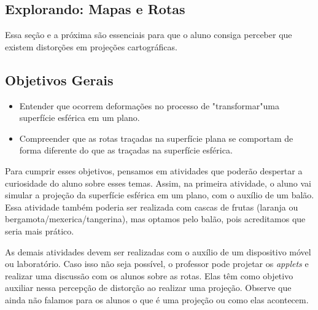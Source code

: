 \def\currentcolor{session1}
\begin{texto}{
\section{Explorando: Mapas e Rotas}

Essa seção e a próxima são essenciais para que o aluno consiga perceber que existem distorções em projeções cartográficas.

\subsection{Objetivos Gerais}

\begin{itemize}
\item Entender que ocorrem deformações no processo de  "transformar"{}uma superfície esférica em um plano.

\item Compreender que as rotas traçadas na superfície plana se comportam de forma diferente do que as traçadas na superfície esférica.
\end{itemize}

Para cumprir esses objetivos, pensamos em atividades que poderão despertar a curiosidade do aluno sobre esses temas. Assim, na primeira atividade, o aluno vai simular a projeção da superfície esférica em um plano, com o auxílio de um balão. Essa atividade também poderia ser realizada com cascas de frutas (laranja ou bergamota/mexerica/tangerina), mas optamos pelo balão, pois acreditamos que seria mais prático.

As demais atividades devem ser realizadas com o auxílio de um dispositivo móvel ou laboratório. Caso isso não seja possível, o professor pode projetar os \textit{applets} e realizar uma discussão com os alunos sobre as rotas. Elas têm como objetivo auxiliar nessa percepção de distorção  ao realizar uma projeção. Observe que ainda não falamos para os alunos o que é uma projeção ou como elas acontecem.
}
\end{texto}

